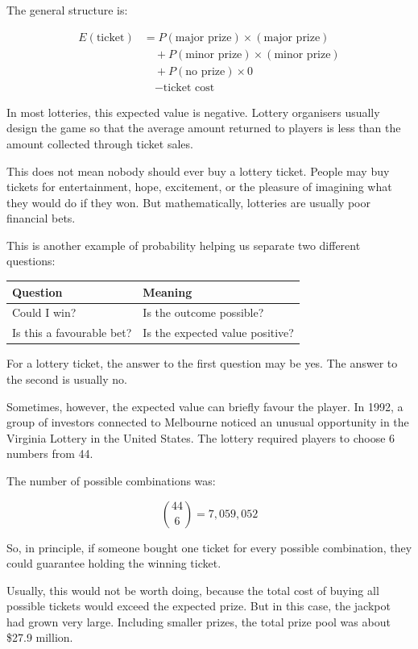 \documentclass[
  letterpaper,
  DIV=11,
  numbers=noendperiod]{scrreprt}
\begin{document}
The general structure is:

\[
\begin{aligned}
E(\text{ticket})
&=
P(\text{major prize})\times(\text{major prize}) \\
&\quad +
P(\text{minor prize})\times(\text{minor prize}) \\
&\quad +
P(\text{no prize})\times 0 \\
&\quad -
\text{ticket cost}
\end{aligned}
\]

In most lotteries, this expected value is negative. Lottery organisers
usually design the game so that the average amount returned to players
is less than the amount collected through ticket sales.

This does not mean nobody should ever buy a lottery ticket. People may
buy tickets for entertainment, hope, excitement, or the pleasure of
imagining what they would do if they won. But mathematically, lotteries
are usually poor financial bets.

This is another example of probability helping us separate two different
questions:

\begin{table}
\fontsize{12.0pt}{14.0pt}\selectfont
\begin{tabular*}{\linewidth}{@{\extracolsep{\fill}}ll}
\toprule
Question & Meaning \\ 
\midrule\addlinespace[2.5pt]
Could I win? & Is the outcome possible? \\ 
Is this a favourable bet? & Is the expected value positive? \\ 
\bottomrule
\end{tabular*}
\end{table}

For a lottery ticket, the answer to the first question may be yes. The
answer to the second is usually no.

Sometimes, however, the expected value can briefly favour the player. In
1992, a group of investors connected to Melbourne noticed an unusual
opportunity in the Virginia Lottery in the United States. The lottery
required players to choose 6 numbers from 44.

The number of possible combinations was:

\[
\binom{44}{6} = 7,059,052
\]

So, in principle, if someone bought one ticket for every possible
combination, they could guarantee holding the winning ticket.

Usually, this would not be worth doing, because the total cost of buying
all possible tickets would exceed the expected prize. But in this case,
the jackpot had grown very large. Including smaller prizes, the total
prize pool was about \$27.9 million.
\end{document}
